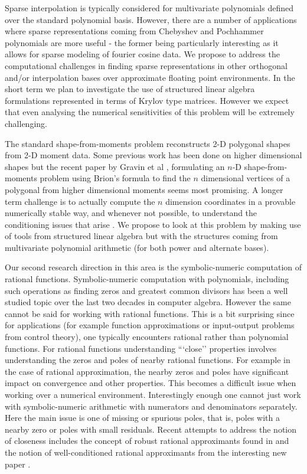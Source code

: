 Sparse interpolation is typically considered for multivariate polynomials defined over the standard polynomial basis. However, there are a number of applications where sparse representations coming from Chebyshev and Pochhammer polynomials \cite{gll2} are more useful - the former being particularly interesting as it allows for sparse modeling of fourier cosine data. We propose to address the computational challenges in finding sparse representations in other orthogonal and/or interpolation bases over approximate floating point environments. In the short term we plan to investigate the use of structured linear algebra formulations represented in terms of Krylov type matrices. However we expect that even analysing the numerical sensitivities of this problem will be extremely challenging. 

The standard shape-from-moments problem reconstructs 2-D polygonal shapes from 2-D moment data. Some previous work has been done on higher dimensional shapes \cite{cuyt} but the recent paper by Gravin et al \cite{lasserre}, formulating an $n$-D shape-from-moments problem using Brion's formula to find the $n$ dimensional vertices of a polygonal from higher dimensional moments seems most promising. A longer term challenge is to actually compute the $n$ dimension coordinates in a provable numerically stable way, and whenever not possible, to understand the conditioning issues that arise \cite{cchlc}. We propose to look at this problem by making use of tools from structured linear algebra but with the structures coming from multivariate polynomial arithmetic (for both power and alternate bases). 

Our second research direction in this area is the symbolic-numeric computation of rational functions. 
Symbolic-numeric computation with polynomials, including such operations as finding zeros and greatest common divisors has been a well studied topic over the last two decades in computer algebra. However the same cannot be said for working with rational functions. This is a bit surprising since for applications (for example function approximations or input-output problems from control theory), one typically encounters rational rather than polynomial functions. For rational functions understanding ```close'' properties involves understanding the zeros and poles of nearby rational functions. For example in the case of rational approximation, the nearby zeros and poles have significant impact on convergence and other properties.  This becomes a difficult issue when working over a numerical environment. Interestingly enough one cannot just work with symbolic-numeric arithmetic with numerators and denominators separately. Here the main issue is one of missing or spurious poles, that is, poles with a nearby zero or poles with small residuals.  Recent attempts to address the notion of closeness includes the %
concept of
robust rational approximants found in \cite{gonnet} and the notion of well-conditioned rational approximants from the interesting new paper \cite{matos}.

